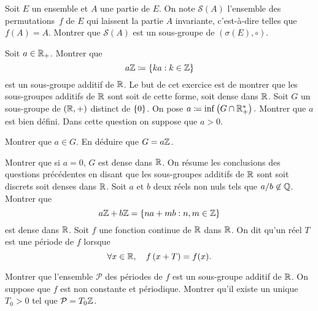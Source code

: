 \documentclass{magnolia}
\begin{document}
Soit $E$ un ensemble et $A$ une partie de $E$. On note $\mathcal{S}(A)$
l'ensemble des permutations~$f$ de $E$ qui laissent la partie $A$ invariante,
c'est-à-dire telles que $f(A)=A$. Montrer que $\mathcal{S}(A)$ est un
sous-groupe de $(\sigma(E),\circ)$.


\begin{questions}
\question Soit $a\in\mathbb{R}_+$. Montrer que
  \[a\mathbb{Z}\coloneqq\left\{ka : k\in\mathbb{Z}\right\}\]
  est un sous-groupe additif de $\mathbb{R}$.
\enonce Le but de cet exercice est de montrer que les sous-groupes additifs de $\mathbb{R}$ sont soit de cette forme, soit dense dans $\mathbb{R}$. Soit $G$ un sous-groupe de $\left(\mathbb{R},+\right)$ distinct de $\left\{0\right\}$. On pose $a\coloneqq\inf\left(G\cap\mathbb{R}_+^*\right).$
\question Montrer que $a$ est bien défini.
\question Dans cette question on suppose que $a>0$.
  \begin{questions}
  \question Montrer que $a\in G$.
  \question En déduire que $G=a\mathbb{Z}$.
  \end{questions}
\question Montrer que si $a=0$, $G$ est dense dans $\mathbb{R}$.
\enonce On résume les conclusions des questions précédentes en disant que les
  sous-groupes additifs de $\mathbb{R}$ sont soit discrets soit denses dans $\mathbb{R}$.
\question 
  Soit $a$ et $b$ deux réels non nuls tels que $a/b\not\in\mathbb{Q}$. Montrer que
  \[a\mathbb{Z}+b\mathbb{Z}=\left\{na+mb : n,m\in\mathbb{Z}\right\}\]
  est dense dans $\mathbb{R}$.
\question 
  Soit $f$ une fonction continue de $\mathbb{R}$ dans $\mathbb{R}$. On dit qu'un réel $T$ est
  une période de $f$ lorsque
  \[\forall x\in\mathbb{R} ,\quad f\left(x+T\right)=f(x).\]
  \begin{questions}
  \question Montrer que l'ensemble $\mathcal{P}$ des périodes de $f$ est un
    sous-groupe additif de $\mathbb{R}$.
  \question On suppose que $f$ est non constante et périodique. Montrer qu'il
    existe un unique $T_0>0$ tel que $\mathcal{P}=T_0\mathbb{Z}$.
  \end{questions}
\end{questions}
\end{document}
